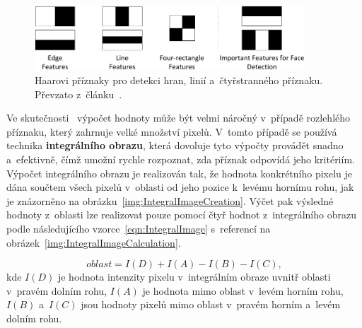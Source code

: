 \begin{figure}[hbt]
	\centering
	\setlength{\fboxsep}{0pt}
	\includegraphics[width=0.9\textwidth]{obrazky-figures/haar_features.pdf}
	\caption{Haarovi příznaky pro detekci hran, linií a~čtyřstranného příznaku. Převzato z~článku~\cite{website:FacialRecognitionViolaJones}.}
	\label{img:HaarLikeFeatures}
\end{figure}

Ve skutečnosti~\cite{website:FaceDetectionViolaJones, website:FacialRecognitionViolaJones} výpočet hodnoty může být velmi náročný v~případě rozlehlého příznaku, který zahrnuje velké množství pixelů. V~tomto případě se používá technika \textbf{integrálního obrazu}, která dovoluje tyto výpočty provádět snadno a~efektivně, čímž umožní rychle rozpoznat, zda příznak odpovídá jeho kritériím. Výpočet integrálního obrazu je realizován tak, že hodnota konkrétního pixelu je dána součtem všech pixelů v~oblasti od jeho pozice k~levému hornímu rohu, jak je znázorněno na obrázku~\ref{img:IntegralImageCreation}. Výčet pak výsledné hodnoty z~oblasti lze realizovat pouze pomocí čtyř hodnot z~integrálního obrazu podle následujícího vzorce~\ref{eqn:IntegralImage} s~referencí na obrázek~\ref{img:IntegralImageCalculation}.

\begin{equation}
    \label{eqn:IntegralImage}
    oblast = I(D) + I(A) - I(B) - I(C),
\end{equation}
kde $I(D)$ je hodnota intenzity pixelu v~integrálním obraze uvnitř oblasti v~pravém dolním rohu, $I(A)$ je hodnota mimo oblast v~levém horním rohu, $I(B)$ a~$I(C)$ jsou hodnoty pixelů mimo oblast v~pravém horním a~levém dolním rohu.


